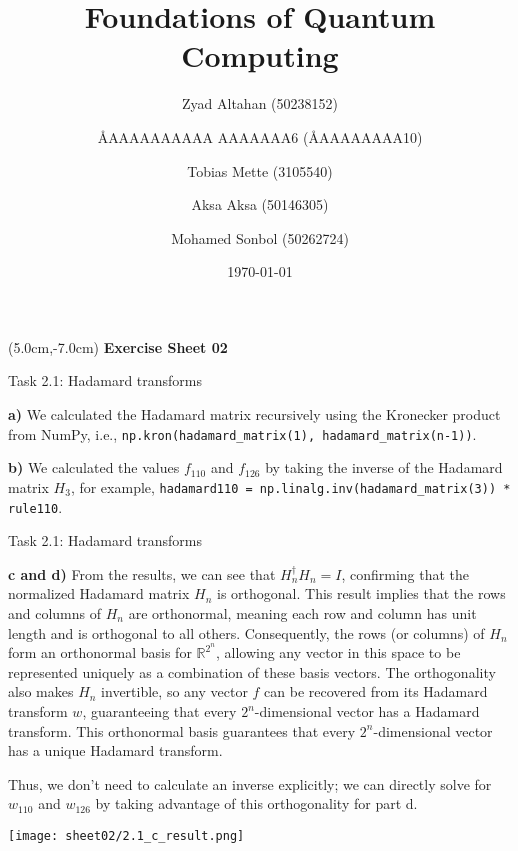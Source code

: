 \documentclass[aspectratio=169]{beamer}
\title{Foundations of Quantum Computing}
\author[]{Zyad Altahan (50238152) \and \AA{AAAAAAAAAA AAAAAAA}{6} (\AA{AAAAAAAA}{10}) \and Tobias Mette (3105540) \and Aksa Aksa (50146305) \and Mohamed Sonbol (50262724)}
\institute[]{Department of Computer Science \\ University of Bonn}
\date{\today}
\begin{document}
\begin{frame}
    \titlepage
    \begin{textblock*}{8cm}(5.0cm,-7.0cm)
        {\large \color{uwopurple}\hspace{0.66cm} \textbf{Exercise Sheet 02}} %
    \end{textblock*}
\end{frame}


\begin{frame}[fragile]{Task 2.1: Hadamard transforms}

\textbf{a)} We calculated the Hadamard matrix recursively using the Kronecker product from NumPy, i.e., \texttt{np.kron(hadamard\_matrix(1), hadamard\_matrix(n-1))}.

\vspace{1em}

\textbf{b)} We calculated the values $f_{110}$ and $f_{126}$ by taking the inverse of the Hadamard matrix $H_3$, for example, \texttt{hadamard110 = np.linalg.inv(hadamard\_matrix(3)) * rule110}.
\end{frame}

\begin{frame}[fragile]{Task 2.1: Hadamard transforms}

{\footnotesize
\textbf{c and d)} From the results, we can see that \( H_n^\dagger H_n = I \), confirming that the normalized Hadamard matrix \( H_n \) is orthogonal. This result implies that the rows and columns of \( H_n \) are orthonormal, meaning each row and column has unit length and is orthogonal to all others. Consequently, the rows (or columns) of \( H_n \) form an orthonormal basis for \( \mathbb{R}^{2^n} \), allowing any vector in this space to be represented uniquely as a combination of these basis vectors. The orthogonality also makes \( H_n \) invertible, so any vector \( f \) can be recovered from its Hadamard transform \( w \), guaranteeing that every \( 2^n \)-dimensional vector has a Hadamard transform. This orthonormal basis guarantees that every \( 2^n \)-dimensional vector has a unique Hadamard transform.

Thus, we don’t need to calculate an inverse explicitly; we can directly solve for $w_{110}$ and $w_{126}$ by taking advantage of this orthogonality for part d.
}

\texttt{[image: sheet02/2.1\_c\_result.png]}

\end{frame}
\end{document}
